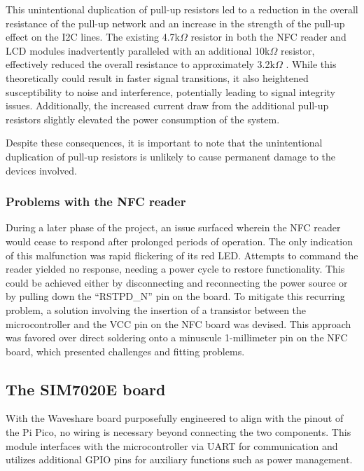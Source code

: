 This unintentional duplication of pull-up resistors led to a reduction in the overall resistance of the pull-up network 
and an increase in the strength of the pull-up effect on the I2C lines. The existing 4.7k$\Omega$ resistor in both the NFC 
reader and LCD modules inadvertently paralleled with an additional 10k$\Omega$ resistor, effectively reduced the overall 
resistance to approximately 3.2k$\Omega$ \cite{pn532_elechouse_schematics}. While this theoretically could result in faster 
signal transitions, it also heightened susceptibility to noise and interference, potentially leading to signal integrity 
issues. Additionally, the increased current draw from the additional pull-up resistors slightly elevated the power 
consumption of the system.

Despite these consequences, it is important to note that the unintentional duplication of pull-up resistors is unlikely to 
cause permanent damage to the devices involved.

\subsubsection*{Problems with the NFC reader}

During a later phase of the project, an issue surfaced wherein the NFC reader would cease to respond after prolonged periods 
of operation. The only indication of this malfunction was rapid flickering of its red LED. Attempts to command the reader 
yielded no response, needing a power cycle to restore functionality. This could be achieved either by disconnecting and 
reconnecting the power source or by pulling down the ``RSTPD\_N'' pin on the board. To mitigate this recurring problem, a 
solution involving the insertion of a transistor between the microcontroller and the VCC pin on the NFC board was devised. 
This approach was favored over direct soldering onto a minuscule 1-millimeter pin on the NFC board, which presented 
challenges and fitting problems.


\subsection{The SIM7020E board}

With the Waveshare board purposefully engineered to align with the pinout of the Pi Pico, no wiring is necessary beyond 
connecting the two components. This module interfaces with the microcontroller via UART for communication and utilizes 
additional GPIO pins for auxiliary functions such as power management.

